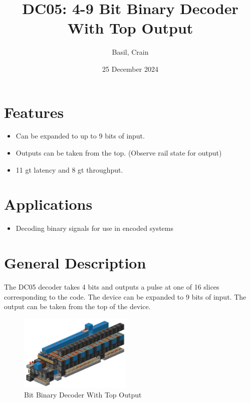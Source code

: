 \documentclass[10pt]{datasheet}
\title{DC05: 4-9 Bit Binary Decoder With Top Output}
\author{Basil, Crain}
\date{25 December 2024}
\begin{document}
\maketitle

\section{Features}

\begin{itemize}
\item{Can be expanded to up to 9 bits of input.}
\item{Outputs can be taken from the top. (Observe rail state for output)}
\item{11 gt latency and 8 gt throughput.}
\end{itemize}

\section{Applications}

\begin{itemize}
\item{Decoding binary signals for use in encoded systems}
\end{itemize}

\section{General Description}
The DC05 decoder takes 4 bits and outputs a pulse at one of 16 slices corresponding to the code. The device can be expanded to 9 bits of input. The output can be taken from the top of the device.
\vfill\break

\begin{figure}[H]
    \centering
    \includegraphics[width=0.48\textwidth]{decoderpic.png}
    \caption{ Bit Binary Decoder With Top Output}
\end{figure}

\onecolumn
\end{document}
